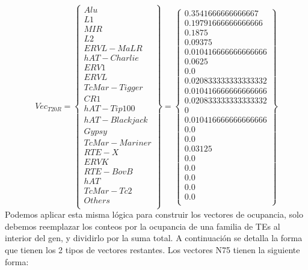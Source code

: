 \documentclass[12pt]{article}
\begin{document}
\begin{equation*}
    Vec_{T20R} =
    \begin{Bmatrix}
        Alu\\
        L1\\
        MIR\\
        L2\\
        ERVL-MaLR\\
        hAT-Charlie\\
        ERV1\\
        ERVL\\
        TcMar-Tigger\\
        CR1\\
        hAT-Tip100\\
        hAT-Blackjack\\
        Gypsy\\
        TcMar-Mariner\\
        RTE-X\\
        ERVK\\
        RTE-BovB\\
        hAT\\
        TcMar-Tc2\\
        Others\\
    \end{Bmatrix}
    =
    \begin{Bmatrix}
	0.3541666666666667\\
	0.19791666666666666\\
	0.1875\\
	0.09375\\
	0.010416666666666666\\
	0.0625\\
	0.0\\
	0.020833333333333332\\
	0.010416666666666666\\
	0.020833333333333332\\
	0\\
	0.010416666666666666\\
	0.0\\
	0.0\\
	0.03125\\
	0.0\\
	0.0\\
	0.0\\
	0.0\\
	0.0\\
    \end{Bmatrix}
\end{equation*}
Podemos aplicar esta misma lógica para construir los vectores de ocupancia, solo debemos reemplazar los conteos por la ocupancia de una familia de TEs al interior del gen, y dividirlo por la suma total.
A continuación se detalla la forma que tienen los 2 tipos de vectores restantes. Los vectores N75 tienen la siguiente forma:

\clearpage
\singlespacing %
\end{document}
